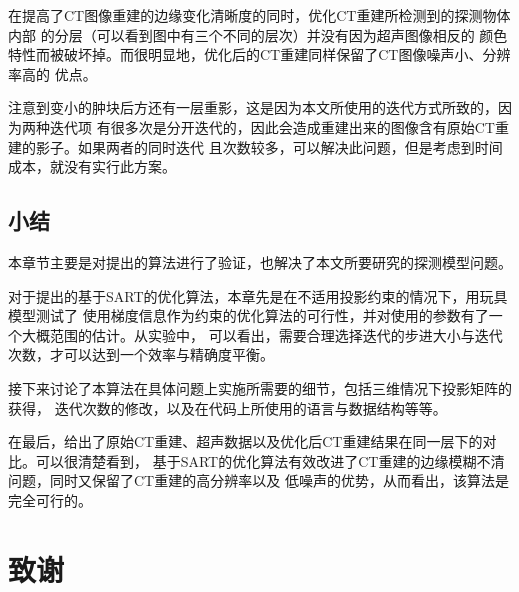 在提高了CT图像重建的边缘变化清晰度的同时，优化CT重建所检测到的探测物体内部
的分层（可以看到图中有三个不同的层次）并没有因为超声图像相反的
颜色特性而被破坏掉。而很明显地，优化后的CT重建同样保留了CT图像噪声小、分辨率高的
优点。

注意到变小的肿块后方还有一层重影，这是因为本文所使用的迭代方式所致的，因为两种迭代项
有很多次是分开迭代的，因此会造成重建出来的图像含有原始CT重建的影子。如果两者的同时迭代
且次数较多，可以解决此问题，但是考虑到时间成本，就没有实行此方案。
\section{小结}
本章节主要是对提出的算法进行了验证，也解决了本文所要研究的探测模型问题。

对于提出的基于SART的优化算法，本章先是在不适用投影约束的情况下，用玩具模型测试了
使用梯度信息作为约束的优化算法的可行性，并对使用的参数有了一个大概范围的估计。从实验中，
可以看出，需要合理选择迭代的步进大小与迭代次数，才可以达到一个效率与精确度平衡。

接下来讨论了本算法在具体问题上实施所需要的细节，包括三维情况下投影矩阵的获得，
迭代次数的修改，以及在代码上所使用的语言与数据结构等等。

在最后，给出了原始CT重建、超声数据以及优化后CT重建结果在同一层下的对比。可以很清楚看到，
基于SART的优化算法有效改进了CT重建的边缘模糊不清问题，同时又保留了CT重建的高分辨率以及
低噪声的优势，从而看出，该算法是完全可行的。

\chapter{致谢}




